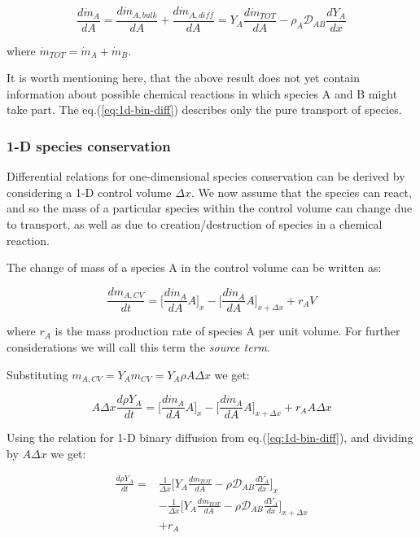 \documentclass[10pt,twocolumn]{article}
\begin{document}
\begin{equation}
\frac{d \dot{m}_A }{dA} = \frac{d \dot{m}_{A, bulk}}{dA} + \frac{d \dot{m}_{A, diff}}{dA} = Y_A \frac{d \dot{m}_{TOT}}{d A} - \rho_A \mathcal{D}_{AB} \frac{dY_A}{dx}
\end{equation}\label{eq:1d-bin-diff}

where $\dot{m}_{TOT} = \dot{m}_A + \dot{m}_B$.

It is worth mentioning here, that the above result does not yet contain information about possible chemical reactions in which species A and B might take part. The eq.(\ref{eq:1d-bin-diff}) describes only the pure transport of species.

\subsubsection{1-D species conservation}

Differential relations for one-dimensional species conservation can be derived by considering a 1-D control volume $\Delta x$. We now assume that the species can react, and so the mass of a particular species within the control volume can change due to transport, as well as due to creation/destruction of species in a chemical reaction. 

The change of mass of a species A in the control volume can be written as:

\begin{equation}
\frac{d m_{A, CV} }{dt} = \Big[ \frac{d \dot{m}_A}{d A} A \Big]_x - \Big[ \frac{d \dot{m}_A}{d A} A \Big]_{x + \Delta x} + r_A V
\end{equation}

where $r_A$ is the mass production rate of species A per unit volume. For further considerations we will call this term the \textit{source term}.

Substituting $m_{A, CV} = Y_A m_{CV} = Y_A \rho A \Delta x$ we get:

\begin{equation}
A \Delta x \frac{d \rho Y_{A} }{dt} = \Big[ \frac{d \dot{m}_A}{d A} A \Big]_x - \Big[ \frac{d \dot{m}_A}{d A} A \Big]_{x + \Delta x} + r_A A \Delta x
\end{equation}

Using the relation for 1-D binary diffusion from eq.(\ref{eq:1d-bin-diff}), and dividing by $A \Delta x$ we get:

\begin{equation}
\begin{aligned}
\frac{d \rho Y_{A} }{dt} = & \frac{1}{\Delta x}\Big[ Y_A \frac{d \dot{m}_{TOT}}{d A} - \rho \mathcal{D}_{AB} \frac{dY_A}{dx} \Big]_x \\
& - \frac{1}{\Delta x} \Big[ Y_A \frac{d \dot{m}_{TOT}}{d A} - \rho \mathcal{D}_{AB} \frac{dY_A}{dx} \Big]_{x + \Delta x} \\
& + r_A
\end{aligned}
\end{equation}
\end{document}
